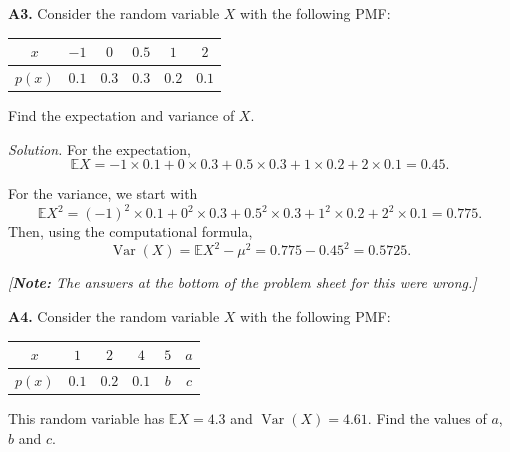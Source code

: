 \documentclass[
  a4paper,
]{book}
\theoremstyle{definition}
\theoremstyle{definition}
\theoremstyle{definition}
\theoremstyle{definition}
\theoremstyle{remark}
\begin{document}
\textbf{A3.} Consider the random variable \(X\) with the following PMF:

\begin{longtable}[]{@{}cccccc@{}}
\toprule
\(x\) & \(-1\) & \(0\) & \(0.5\) & \(1\) & \(2\) \\
\midrule
\endhead
\(p(x)\) & \(0.1\) & \(0.3\) & \(0.3\) & \(0.2\) & \(0.1\) \\
\bottomrule
\end{longtable}

Find the expectation and variance of \(X\).

\begin{myanswers}
\emph{Solution.}
For the expectation,
\[ \mathbb EX = -1\times0.1 + 0\times0.3 + 0.5\times0.3+1\times0.2+2\times0.1 = 0.45. \]

For the variance, we start with
\[ \mathbb EX^2 = (-1)^2\times0.1 + 0^2\times0.3 + 0.5^2\times0.3+1^2\times0.2+2^2\times0.1 = 0.775 . \]
Then, using the computational formula,
\[ \operatorname{Var}(X) = \mathbb EX^2 - \mu^2 = 0.775 - 0.45^2 = 0.5725. \]

\emph{{[}\textbf{Note:} The answers at the bottom of the problem sheet for this were wrong.{]}}

\end{myanswers}

\textbf{A4.} Consider the random variable \(X\) with the following PMF:

\begin{longtable}[]{@{}cccccc@{}}
\toprule
\(x\) & \(1\) & \(2\) & \(4\) & \(5\) & \(a\) \\
\midrule
\endhead
\(p(x)\) & \(0.1\) & \(0.2\) & \(0.1\) & \(b\) & \(c\) \\
\bottomrule
\end{longtable}

This random variable has \(\mathbb EX = 4.3\) and \(\operatorname{Var}(X) = 4.61\). Find the values of \(a\), \(b\) and \(c\).
\end{document}
